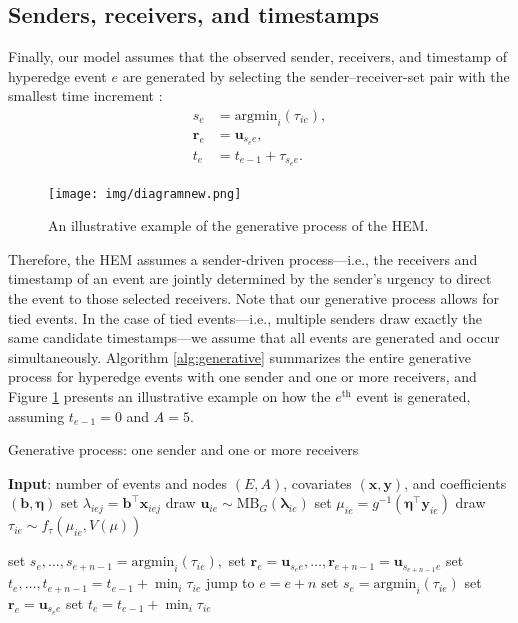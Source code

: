 \documentclass[ba]{imsart}
\def\spacingset#1{\renewcommand{\baselinestretch}%
	{#1}\small\normalsize} \spacingset{1}
\numberwithin{equation}{section}
\theoremstyle{plain}
\begin{document}
	\subsection{Senders, receivers, and timestamps}\label{subsec:Observed}
	Finally, our model assumes that the observed sender, receivers, and timestamp of hyperedge event $e$ are generated by selecting the sender--receiver-set pair with the smallest time increment \citep{snijders1996stochastic}:
	\begin{equation}
		\begin{aligned}
			s_e &= \mbox{argmin}_{i}(\tau_{ie}),\\
			\boldsymbol{r}_e &= \boldsymbol{u}_{s_e e},\\
			t_e &=t_{e-1} + \tau_{s_e e}.
		\end{aligned}
	\end{equation}
	\begin{figure}[!t]
		\centering
		\texttt{[image: img/diagramnew.png]}	
		\caption {An illustrative example of the generative process of the HEM.}
		\label{figure:diagram}
	\end{figure}	
		Therefore, the HEM assumes a sender-driven process---i.e., the receivers and timestamp of an event are jointly determined by the sender's urgency to direct the event to those selected receivers. Note that our generative process allows for tied events. In the case of tied events---i.e., multiple senders draw exactly the same candidate timestamps---we assume that all events are generated and occur simultaneously. Algorithm \ref{alg:generative} summarizes the entire generative process for hyperedge events with one sender and one or more receivers, and Figure \ref{figure:diagram} presents an illustrative example on how the $e^{\textrm{th}}$ event is generated, assuming $t_{e-1} = 0$ and $A=5$.~
	\begin{algorithm}[!t]
		\spacingset{1}
		\SetAlgoLined
		\caption{Generative process: one sender and one or more receivers}
		\begin{algorithmic}
			\STATE \textbf{Input}: number of events and nodes $(E, A)$, covariates $(\boldsymbol{x}, \boldsymbol{y})$, and coefficients $(\boldsymbol{b}, \boldsymbol{\eta})$
			\vskip 0.1in
			\STATE	set $\lambda_{iej} = {\boldsymbol{b}}^{\top}\boldsymbol{x}_{iej}$
			\ENDFOR
			\STATE	draw $\boldsymbol{u}_{ie}  \sim
			\mbox{MB}_G(\boldsymbol{\lambda}_{ie})$
			\STATE		set $\mu_{ie} = g^{-1}(\boldsymbol{\eta}^\top \boldsymbol{y}_{ie})$
			\STATE		draw $\tau_{ie} \sim f_\tau(\mu_{ie}, V(\mu))$
			\ENDFOR
			
			\STATE	set $s_e,\ldots, s_{e+n-1}=\mbox{argmin}_{i}(\tau_{ie}),$
			\STATE	set $\boldsymbol{r}_e=\boldsymbol{u}_{s_e e},\ldots,\boldsymbol{r}_{e+n-1}=\boldsymbol{u}_{s_{e+n-1} e}$
			\STATE	set $t_e, \ldots, t_{e+n-1}=t_{e-1} + \min_i\tau_{ie}$
			\STATE		jump to $e = e+n$
			\ELSE
			\STATE	set $s_e= \mbox{argmin}_{i}(\tau_{ie})$
			\STATE		set $\boldsymbol{r}_e = \boldsymbol{u}_{s_e e}$
			\STATE	set $t_e =t_{e-1} + \min_i\tau_{ie}$
			\ENDIF
			\ENDFOR
		\end{algorithmic}
		\label{alg:generative}
	\end{algorithm}
\end{document}
